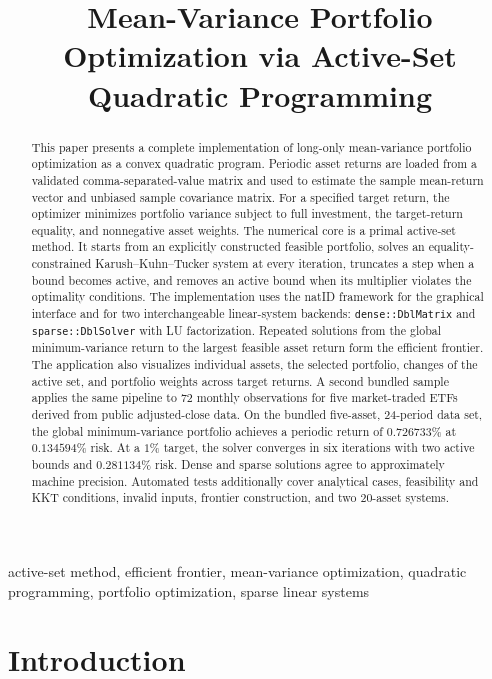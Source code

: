 \documentclass[conference]{IEEEtran}
\title{Mean-Variance Portfolio Optimization via Active-Set Quadratic Programming}
\author{%
\IEEEauthorblockN{Tarik Agi\'{c}}
\IEEEauthorblockA{Student ID: 20108\\
Numerical Optimization Course Project}
}
\begin{document}
\maketitle

\begin{abstract}
This paper presents a complete implementation of long-only mean-variance
portfolio optimization as a convex quadratic program. Periodic asset returns
are loaded from a validated comma-separated-value matrix and used to estimate
the sample mean-return vector and unbiased sample covariance matrix. For a
specified target return, the optimizer minimizes portfolio variance subject to
full investment, the target-return equality, and nonnegative asset weights.
The numerical core is a primal active-set method. It starts from an explicitly
constructed feasible portfolio, solves an equality-constrained
Karush--Kuhn--Tucker system at every iteration, truncates a step when a bound
becomes active, and removes an active bound when its multiplier violates the
optimality conditions. The implementation uses the natID framework for the
graphical interface and for two interchangeable linear-system backends:
\texttt{dense::DblMatrix} and \texttt{sparse::DblSolver} with LU
factorization. Repeated solutions from the global minimum-variance return to
the largest feasible asset return form the efficient frontier. The application
also visualizes individual assets, the selected portfolio, changes of the
active set, and portfolio weights across target returns. A second bundled sample 
applies the same pipeline to 72 monthly observations for five market-traded ETFs 
derived from public adjusted-close data. On the bundled five-asset, 24-period data 
set, the global minimum-variance portfolio achieves a periodic return of $0.726733\%$ 
at $0.134594\%$ risk. At a $1\%$ target, the solver converges in six iterations 
with two active bounds and $0.281134\%$ risk. Dense and sparse solutions agree
to approximately machine precision. Automated tests additionally cover analytical 
cases, feasibility and KKT conditions, invalid inputs, frontier construction, and 
two 20-asset systems.
\end{abstract}

\begin{IEEEkeywords}
active-set method, efficient frontier, mean-variance optimization, quadratic
programming, portfolio optimization, sparse linear systems
\end{IEEEkeywords}

\section{Introduction}
\end{document}
